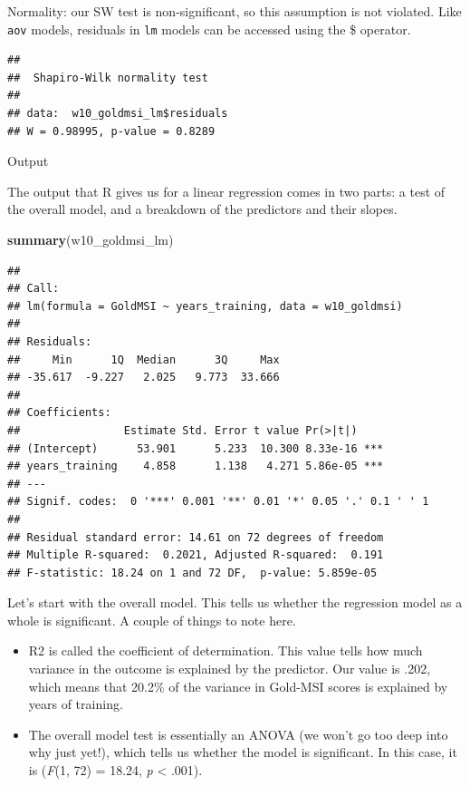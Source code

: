 \documentclass[
]{book}
\newenvironment{Shaded}{\begin{snugshade}}{\end{snugshade}}
\newcommand{\FunctionTok}[1]{\textcolor[rgb]{0.13,0.29,0.53}{\textbf{#1}}}
\newcommand{\NormalTok}[1]{#1}
\newcommand{\SpecialCharTok}[1]{\textcolor[rgb]{0.81,0.36,0.00}{\textbf{#1}}}
\providecommand{\tightlist}{%
  \setlength{\itemsep}{0pt}\setlength{\parskip}{0pt}}
\begin{document}
Normality: our SW test is non-significant, so this assumption is not violated. Like \texttt{aov} models, residuals in \texttt{lm} models can be accessed using the \$ operator.

\begin{Shaded}
\end{Shaded}

\begin{verbatim}
## 
##  Shapiro-Wilk normality test
## 
## data:  w10_goldmsi_lm$residuals
## W = 0.98995, p-value = 0.8289
\end{verbatim}

Output

The output that R gives us for a linear regression comes in two parts: a test of the overall model, and a breakdown of the predictors and their slopes.

\begin{Shaded}
\begin{Highlighting}[]
\FunctionTok{summary}\NormalTok{(w10\_goldmsi\_lm)}
\end{Highlighting}
\end{Shaded}

\begin{verbatim}
## 
## Call:
## lm(formula = GoldMSI ~ years_training, data = w10_goldmsi)
## 
## Residuals:
##     Min      1Q  Median      3Q     Max 
## -35.617  -9.227   2.025   9.773  33.666 
## 
## Coefficients:
##                Estimate Std. Error t value Pr(>|t|)    
## (Intercept)      53.901      5.233  10.300 8.33e-16 ***
## years_training    4.858      1.138   4.271 5.86e-05 ***
## ---
## Signif. codes:  0 '***' 0.001 '**' 0.01 '*' 0.05 '.' 0.1 ' ' 1
## 
## Residual standard error: 14.61 on 72 degrees of freedom
## Multiple R-squared:  0.2021, Adjusted R-squared:  0.191 
## F-statistic: 18.24 on 1 and 72 DF,  p-value: 5.859e-05
\end{verbatim}

Let's start with the overall model. This tells us whether the regression model as a whole is significant. A couple of things to note here.

\begin{itemize}
\tightlist
\item
  R2 is called the coefficient of determination. This value tells how much variance in the outcome is explained by the predictor. Our value is .202, which means that 20.2\% of the variance in Gold-MSI scores is explained by years of training.
\item
  The overall model test is essentially an ANOVA (we won't go too deep into why just yet!), which tells us whether the model is significant. In this case, it is (\emph{F}(1, 72) = 18.24, \emph{p} \textless{} .001).
\end{itemize}
\end{document}
